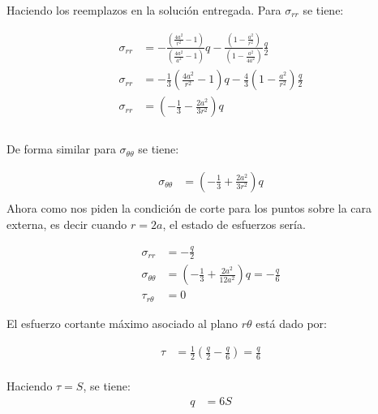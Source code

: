 \documentclass[../notas medios.tex]{subfiles}
\begin{document}
\begin{enumerate}
Haciendo los reemplazos en la solución entregada. Para $\sigma _{rr} $ se tiene: 

\begin{equation*}
\begin{split}
{\sigma _{rr}} &  =  - \frac{{\left( {\frac{{{4a^2}}}{{{r^2}}} - 1} \right)}}{{\left( {\frac{{{4a^2}}}{{{a^2}}} - 1} \right)}}{q} - \frac{{\left( {1 - \frac{{{a^2}}}{{{r^2}}}} \right)}}{{\left( {1 - \frac{{{a^2}}}{{{4a^2}}}} \right)}}\frac{q}{2}\\
{\sigma _{rr}} &  =  - \frac{1}{3}\left( {\frac{{{4a^2}}}{{{r^2}}} - 1} \right) {q} - \frac{4}{3} \left( {1 - \frac{{{a^2}}}{{{r^2}}}} \right)\frac{q}{2}\\
{\sigma _{rr}} &  = \left( - \frac{1}{3} - \frac{{{2a^2}}}{{{3r^2}}} \right) {q} \\\\
\end{split}
\end{equation*}

De forma similar para $\sigma _{\theta\theta} $ se tiene:

\begin{align*}
{\sigma _{\theta\theta}} &  = \left( - \frac{1}{3} + \frac{{{2a^2}}}{{{3r^2}}} \right) {q} \\
\end{align*} 
%
Ahora como nos piden la condición de corte para los puntos sobre la cara externa, es decir cuando $r=2a$, el estado de esfuerzos sería. 

\begin{equation*}
\begin{split}
{\sigma _{rr}} &  = -  \frac{q}{2} \\
{\sigma _{\theta\theta}} &  = \left( - \frac{1}{3} + \frac{{{2a^2}}}{{{12a^2}}} \right) {q} =  -  \frac{q}{6} \\
{\tau _{r\theta} } &= 0
\end{split}
\end{equation*}

El esfuerzo cortante máximo asociado al plano $r\theta$ está dado por: 

\begin{equation*}
\begin{split}
{\tau } &=  \frac{1}{2}\left( \frac{q}{2} - \frac{q}{6} \right) = \frac{q}{6}   \\
\end{split}
\end{equation*}

Haciendo $\tau = S$, se tiene: 
%
\begin{equation*}
\begin{split}
{q } &=  6S   \\
\end{split}
\end{equation*}

\end{enumerate}
\end{document}
